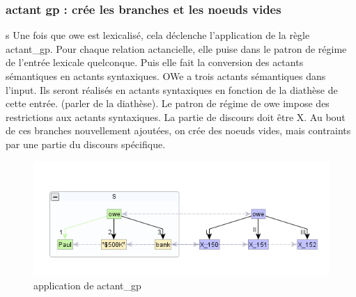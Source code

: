\subsubsection{actant gp : crée les branches et les noeuds vides}s
Une fois que owe est lexicalisé, cela déclenche l'application de la règle actant\_gp. Pour chaque relation actancielle, elle puise dans le patron de régime de l'entrée lexicale quelconque. Puis elle fait la conversion des actants sémantiques en actants syntaxiques. OWe a trois actants sémantiques dans l'input. Ils seront réalisés en actants syntaxiques en fonction de la diathèse de cette entrée. (parler de la diathèse). Le patron de régime de owe impose des restrictions aux actants syntaxiques. La partie de discours doit être X. Au bout de ces branches nouvellement ajoutées, on crée des noeuds vides, mais contraints par une partie du discours spécifique.
\begin{figure}[htb]
	\centering
	\includegraphics[width=1\textwidth, trim = {0cm 0cm 0cm 0cm},clip]{ch3/figs/actant_gp1.png}
	\caption{application de actant\_gp}
	\label{fig:actantgp}
\end{figure}

